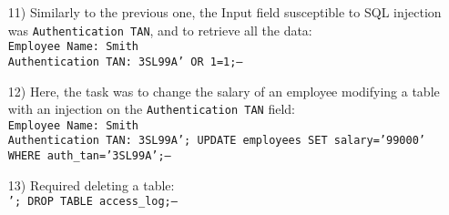 \documentclass{article}
\begin{document}
\begin{itemize}
    \item[11)] {Similarly to the previous one, the Input field susceptible to SQL injection was \texttt{Authentication TAN}, and to retrieve all the data:\\
    \texttt{Employee Name: Smith\\Authentication TAN: 3SL99A' OR 1=1;--}}
    
    \item[12)] {Here, the task was to change the salary of an employee modifying a table with an injection on the \texttt{Authentication TAN} field:\\
    \texttt{Employee Name: Smith\\Authentication TAN: 3SL99A'; UPDATE employees SET salary='99000' WHERE auth\_tan='3SL99A';--}}
    
    \item[13)] {Required deleting a table:\\
    \texttt{'; DROP TABLE access\_log;--}}
\end{itemize}
\end{document}
